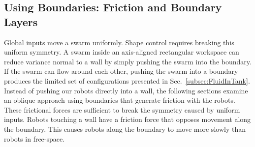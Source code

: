 %


\subsection{Using Boundaries: Friction and Boundary Layers}\label{subsec:WallFriction}
Global inputs move a swarm uniformly.  
Shape control requires breaking this uniform symmetry.  
A swarm inside an axis-aligned rectangular workspace can reduce variance normal to a wall by simply pushing the swarm into the boundary. 
If the swarm can flow around each other, pushing the swarm into a boundary produces the limited set of configurations presented in Sec.~\ref{subsec:FluidInTank}.
Instead of pushing our robots directly into a wall, the following sections examine an oblique approach  using boundaries that generate friction with the robots. 
 These frictional forces are  sufficient to break the symmetry caused by uniform inputs.  
Robots touching a wall have a friction force that opposes movement along the boundary.  
This causes robots along the boundary to move more slowly than robots in free-space. 
  
